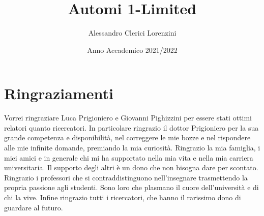 \documentclass[a4paper,twoside]{thesis}
\begin{document}
\title{Automi 1-Limited}
\author{Alessandro Clerici Lorenzini}
\date{Anno Accademico 2021/2022}

\pagestyle{plain}
\maketitle
\thispagestyle{empty}
\cleardoublepage
{}
\tableofcontents

\pagestyle{headings}






\chapter*{Ringraziamenti}
Vorrei ringraziare Luca Prigioniero e Giovanni Pighizzini per essere stati ottimi relatori quanto ricercatori. In particolare ringrazio il dottor Prigioniero per la sua grande competenza e disponibilità, nel correggere le mie bozze e nel rispondere alle mie infinite domande, premiando la mia curiosità.
Ringrazio la mia famiglia, i miei amici e in generale chi mi ha supportato nella mia vita e nella mia carriera universitaria. Il supporto degli altri è un dono che non bisogna dare per scontato.
Ringrazio i professori che si contraddistinguono nell'insegnare trasmettendo la propria passione agli studenti. Sono loro che plasmano il cuore dell'università e di chi la vive.
Infine ringrazio tutti i ricercatori, che hanno il rarissimo dono di guardare al futuro.


\printbibliography[heading=bibintoc]
\end{document}
